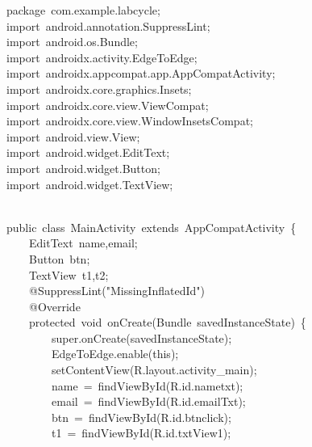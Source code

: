 {\ttfamily\small package\ com.example.labcycle;} \\
{\ttfamily\small import\ android.annotation.SuppressLint;} \\
{\ttfamily\small import\ android.os.Bundle;} \\
{\ttfamily\small import\ androidx.activity.EdgeToEdge;} \\
{\ttfamily\small import\ androidx.appcompat.app.AppCompatActivity;} \\
{\ttfamily\small import\ androidx.core.graphics.Insets;} \\
{\ttfamily\small import\ androidx.core.view.ViewCompat;} \\
{\ttfamily\small import\ androidx.core.view.WindowInsetsCompat;} \\
{\ttfamily\small import\ android.view.View;} \\
{\ttfamily\small import\ android.widget.EditText;} \\
{\ttfamily\small import\ android.widget.Button;} \\
{\ttfamily\small import\ android.widget.TextView;} \\
\strut \\
{\ttfamily\small public\ class\ MainActivity\ extends\ AppCompatActivity\ \{} \\
{\ttfamily\small \ \ \ \ EditText\ name,email;} \\
{\ttfamily\small \ \ \ \ Button\ btn;} \\
{\ttfamily\small \ \ \ \ TextView\ t1,t2;} \\
{\ttfamily\small \ \ \ \ @SuppressLint("MissingInflatedId")} \\
{\ttfamily\small \ \ \ \ @Override} \\
{\ttfamily\small \ \ \ \ protected\ void\ onCreate(Bundle\ savedInstanceState)\ \{} \\
{\ttfamily\small \ \ \ \ \ \ \ \ super.onCreate(savedInstanceState);} \\
{\ttfamily\small \ \ \ \ \ \ \ \ EdgeToEdge.enable(this);} \\
{\ttfamily\small \ \ \ \ \ \ \ \ setContentView(R.layout.activity\_main);} \\
{\ttfamily\small \ \ \ \ \ \ \ \ name\ =\ findViewById(R.id.nametxt);} \\
{\ttfamily\small \ \ \ \ \ \ \ \ email\ =\ findViewById(R.id.emailTxt);} \\
{\ttfamily\small \ \ \ \ \ \ \ \ btn\ =\ findViewById(R.id.btnclick);} \\
{\ttfamily\small \ \ \ \ \ \ \ \ t1\ =\ findViewById(R.id.txtView1);} \\
